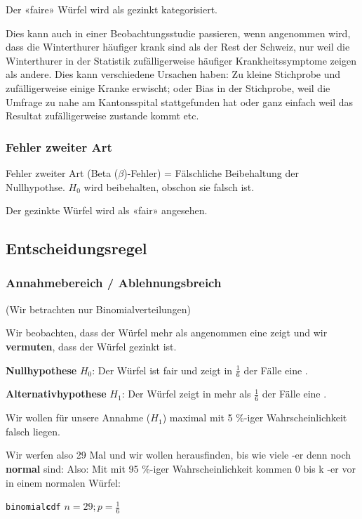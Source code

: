 Der «faire» Würfel wird als gezinkt kategorisiert.

Dies kann auch in einer Beobachtungsstudie passieren, wenn \zB
angenommen wird, dass die Winterthurer häufiger krank sind als der
Rest der Schweiz, nur weil die Winterthurer in der Statistik
zufälligerweise häufiger Krankheitssymptome zeigen als andere. Dies
kann verschiedene Ursachen haben: Zu kleine Stichprobe und
zufälligerweise einige Kranke erwischt; oder Bias in der Stichprobe,
weil die Umfrage zu nahe am Kantonsspital stattgefunden hat oder ganz
einfach weil das Resultat zufälligerweise zustande kommt etc.

\subsubsection{Fehler zweiter Art}
Fehler zweiter Art (Beta ($\beta$)-Fehler) = Fälschliche Beibehaltung
der Nullhypothse. $H_0$ wird beibehalten, obschon sie falsch ist. 

Der gezinkte Würfel wird als «fair» angesehen.

\TNTeop{}
\newpage


\subsection{Entscheidungsregel}
\subsubsection*{Annahmebereich / Ablehnungsbreich}
(Wir betrachten nur Binomialverteilungen)

Wir beobachten, dass der Würfel mehr als angenommen eine 
zeigt und wir \textbf{vermuten}, dass der Würfel gezinkt ist.

\textbf{Nullhypothese} $H_0$: Der Würfel ist fair und zeigt in
$\frac16$ der Fälle eine .

\textbf{Alternativhypothese} $H_1$: Der Würfel zeigt in mehr als
$\frac{1}{6}$ der Fälle eine .

Wir wollen für unsere Annahme ($H_1$) maximal mit 5 \%-iger
Wahrscheinlichkeit falsch liegen.

Wir werfen also 29 Mal und wir wollen herausfinden, bis wie viele
-er denn noch \textbf{normal} sind:
Also: Mit mit 95 \%-iger Wahrscheinlichkeit kommen 0 bis k
-er vor in einem normalen Würfel:

\texttt{binomial\textbf{c}df} $n=29; p=\frac16$

